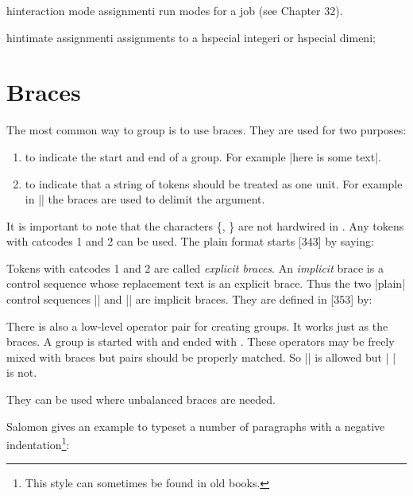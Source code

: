 hinteraction mode assignmenti run modes for a \tex job (see Chapter 32).

hintimate assignmenti assignments to a hspecial integeri or hspecial dimeni;


\section{Braces}

The most common way to group is to use braces. They are used for two purposes:

\begin{enumerate}
\item to indicate the start and end of a group. For example |{\small here is some text}|.

\item to indicate that a string of tokens should be treated as one unit. For example in |\def\abc{...}| the braces are used
to delimit the argument.
\end{enumerate}

It is important to note that the characters \{, \} are not hardwired in \tex. Any tokens with catcodes 1 and 2 can be used.
The plain format starts [343] by saying:

\begin{teX}

\catcode`\{ =1
\catcode `} = 2
\end{teX}

Tokens with catcodes 1 and 2 are called \emph{explicit braces}. An \emph{implicit} brace is a control sequence whose replacement text is an explicit brace. Thus the two |plain| control sequences 
|\bgroup| and |\egroup| are implicit braces. They are defined in [353] by:

There is also a low-level \tex operator pair for creating groups. It works
just as the braces. A group is started with  and ended with
. These operators may be freely mixed with braces but pairs
should be properly matched. So |{ \begingroup \endgroup }| is allowed
but |{ \begingroup } \endgroup| is not.


They can be used where unbalanced braces are needed.

Salomon gives an example to typeset a number of paragraphs with a negative indentation\footnote{This style can sometimes be found in old books.}:

